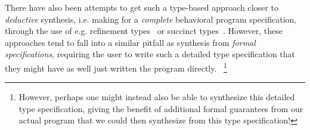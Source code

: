 \documentclass{article}
\begin{document}
There have also been attempts to get such a type-based approach closer to \emph{deductive} synthesis,
i.e. making for a \emph{complete} behavioral program specification,
through the use of e.g. refinement types~\citep{synquid} or succinct types~\citep{guospeeding}.
However, these approaches tend to fall into a similar pitfall as synthesis from \emph{formal specifications},
requiring the user to write such a detailed type specification that they might have as well just written the program directly.%
~\footnote{
    However, perhaps one might instead also be able to synthesize this detailed type specification,
    giving the benefit of additional formal guarantees from our actual program that we could then synthesize from this type specification!
}




\end{document}
